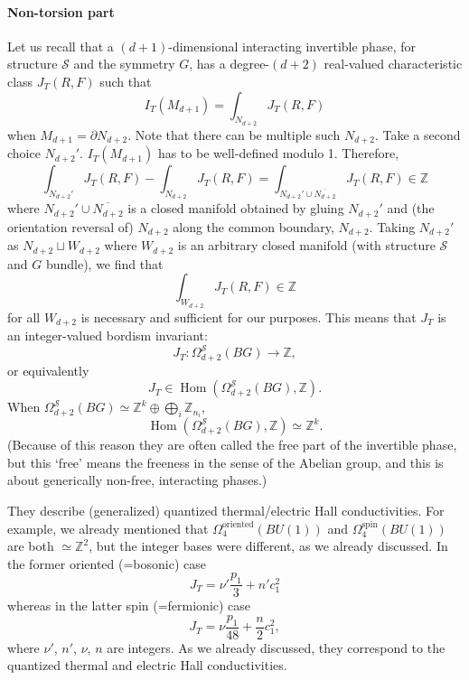 \documentclass[12pt]{article}
\numberwithin{equation}{section}
\numberwithin{figure}{section}
\theoremstyle{remark}
\def\bZ{\mathbb{Z}}
\def\cS{\mathcal{S}}
\def\Hom{\mathop{\mathrm{Hom}}}
\begin{document}
\paragraph{Non-torsion part}
Let us recall that  a $(d+1)$-dimensional interacting invertible phase, for structure $\cS$ and the symmetry $G$,
has a degree-$(d+2)$ real-valued characteristic class $J_T(R,F)$ such that 
\begin{equation}
I_T(M_{d+1}) = \int_{N_{d+2}} J_T(R,F) 
\end{equation}when $M_{d+1}=\partial N_{d+2}$.
Note that there can be multiple such $N_{d+2}$. Take a second choice $N_{d+2}'$.
$I_T(M_{d+1})$ has to be well-defined modulo 1.
Therefore, \begin{equation}
\int_{N_{d+2}'} J_T(R,F) -\int_{N_{d+2}} J_T(R,F) 
=\int_{N_{d+2}'\cup  \overline{N_{d+2}}} J_T(R,F) \in \bZ
\end{equation}
where $N_{d+2}'\cup  \overline{N_{d+2}}$ is a closed manifold obtained by gluing $N_{d+2}'$
and (the orientation reversal of) $N_{d+2}$ along the common boundary, $N_{d+2}$.
Taking $N_{d+2}'$ as $N_{d+2} \sqcup W_{d+2}$ where $W_{d+2}$ is an arbitrary closed manifold 
(with structure $\cS$ and $G$ bundle),
we find that \begin{equation}
\int_{W_{d+2}} J_T(R,F)\in \bZ 
\end{equation} for all $W_{d+2}$ is necessary and sufficient for our purposes.
This means that $J_T$ is an integer-valued bordism invariant: \begin{equation}
J_T \colon \Omega^\cS_{d+2}(BG)\to \bZ, \label{JTbor}
\end{equation} or equivalently \begin{equation}
J_T \in \Hom(\Omega^\cS_{d+2}(BG),\bZ).
\end{equation} When $\Omega^\cS_{d+2}(BG)\simeq \bZ^k \oplus \bigoplus_i \bZ_{n_i}$, \begin{equation}
\Hom(\Omega^\cS_{d+2}(BG),\bZ) \simeq \bZ^k.
\end{equation} 
(Because of this reason they are often called the free part of the invertible phase,
but this `free' means the freeness in the sense of the Abelian group,
and this is about generically non-free, interacting phases.)

They describe (generalized) quantized thermal/electric Hall conductivities.
For example, we already mentioned that 
$\Omega^\text{oriented}_4(BU(1))$ and $\Omega^\text{spin}_4(BU(1))$ are both $\simeq \bZ^2$,
but the integer bases were different, as we already discussed.
In the former oriented (=bosonic) case \begin{equation}
J_T = \nu' \frac{p_1}{3}  + n' c_1^2
\end{equation} whereas in the latter spin (=fermionic) case \begin{equation}
J_T = \nu \frac{p_1}{48}  + \frac{n}{2} c_1^2, 
\end{equation} where $\nu'$, $n'$, $\nu$, $n$ are integers. 
As we already discussed, they correspond to the quantized thermal and electric Hall conductivities.
\end{document}
